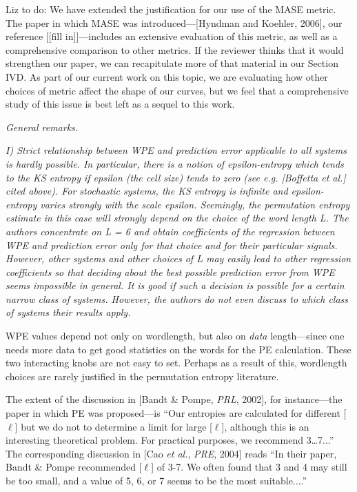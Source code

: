 \documentclass[12pt]{article}
\newcommand{\alert}[1]{{\color{red}#1}}
\begin{document}
\alert{Liz to do: We have extended the justification for our use of
  the MASE metric.}  The paper in which MASE was introduced---[Hyndman
  and Koehler, 2006], our reference \alert{[[fill in]]}---includes an
extensive evaluation of this metric, as well as a comprehensive
comparison to other metrics.  If the reviewer thinks that it would
strengthen our paper, we can recapitulate more of that material in our
Section IVD. As part of our current work on this topic, we are
evaluating how other choices of metric affect the shape of our curves,
but we feel that a comprehensive study of this issue is best left as a
sequel to this work.

\smallskip

\noindent\emph{General remarks.}

\emph{I) Strict relationship between WPE and prediction error
  applicable to all systems is hardly possible. In particular, there
  is a notion of epsilon-entropy which tends to the KS entropy if
  epsilon (the cell size) tends to zero (see e.g.  [Boffetta et al.]
  cited above). For stochastic systems, the KS entropy is infinite and
  epsilon-entropy varies strongly with the scale epsilon. Seemingly,
  the permutation entropy estimate in this case will strongly depend
  on the choice of the word length L. The authors concentrate on L = 6
  and obtain coefficients of the regression between WPE and prediction
  error only for that choice and for their particular
  signals. However, other systems and other choices of L may easily
  lead to other regression coefficients so that deciding about the
  best possible prediction error from WPE seems impossible in
  general. It is good if such a decision is possible for a certain
  narrow class of systems. However, the authors do not even discuss to
  which class of systems their results apply.}

WPE values depend not only on wordlength, but also on \emph{data}
length---since one needs more data to get good statistics on the words
for the PE calculation.  These two interacting knobs are not easy to
set.  Perhaps as a result of this, wordlength choices are rarely
justified in the permutation entropy literature.

The extent of the discussion in [Bandt \& Pompe, {\sl PRL}, 2002], for
instance---the paper in which PE was proposed---is ``Our entropies are
calculated for different [$\ell$] but we do not to determine a limit
for large [$\ell$], although this is an interesting theoretical
problem. For practical purposes, we recommend 3\dots7...''  The
corresponding discussion in [Cao {\sl et al.}, {\sl PRE}, 2004] reads
``In their paper, Bandt \& Pompe recommended [$\ell$] of 3-7.  We
often found that 3 and 4 may still be too small, and a value of 5, 6,
or 7 seems to be the most suitable....''
\end{document}
